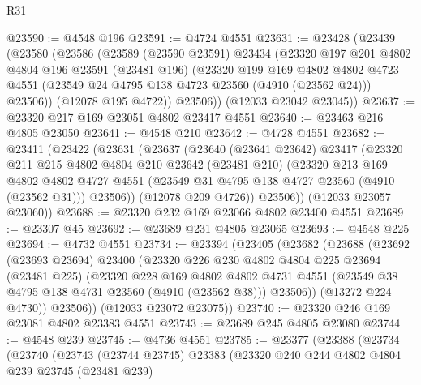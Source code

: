 \begin{lexlean}{R31}
\begin{coremodule}
@23590 := @4548 @196
@23591 := @4724 @4551
@23631 := @23428
    (@23439
      (@23580
        (@23586
          (@23589
            (@23590 @23591)
            @23434
            (@23320
              @197
              @201
              @4802
              @4804
              @196
              @23591
              (@23481 @196)
              (@23320
                @199
                @169
                @4802
                @4802
                @4723
                @4551
                (@23549 @24 @4795 @138 @4723 @23560 (@4910 (@23562 @24)))
                @23506))
            (@12078 @195 @4722))
          @23506))
      (@12033 @23042 @23045))
@23637 := @23320 @217 @169 @23051 @4802 @23417 @4551
@23640 := @23463 @216 @4805 @23050
@23641 := @4548 @210
@23642 := @4728 @4551
@23682 := @23411
    (@23422
      (@23631
        (@23637
          (@23640
            (@23641 @23642)
            @23417
            (@23320
              @211
              @215
              @4802
              @4804
              @210
              @23642
              (@23481 @210)
              (@23320
                @213
                @169
                @4802
                @4802
                @4727
                @4551
                (@23549 @31 @4795 @138 @4727 @23560 (@4910 (@23562 @31)))
                @23506))
            (@12078 @209 @4726))
          @23506))
      (@12033 @23057 @23060))
@23688 := @23320 @232 @169 @23066 @4802 @23400 @4551
@23689 := @23307 @45
@23692 := @23689 @231 @4805 @23065
@23693 := @4548 @225
@23694 := @4732 @4551
@23734 := @23394
    (@23405
      (@23682
        (@23688
          (@23692
            (@23693 @23694)
            @23400
            (@23320
              @226
              @230
              @4802
              @4804
              @225
              @23694
              (@23481 @225)
              (@23320
                @228
                @169
                @4802
                @4802
                @4731
                @4551
                (@23549 @38 @4795 @138 @4731 @23560 (@4910 (@23562 @38)))
                @23506))
            (@13272 @224 @4730))
          @23506))
      (@12033 @23072 @23075))
@23740 := @23320 @246 @169 @23081 @4802 @23383 @4551
@23743 := @23689 @245 @4805 @23080
@23744 := @4548 @239
@23745 := @4736 @4551
@23785 := @23377
    (@23388
      (@23734
        (@23740
          (@23743
            (@23744 @23745)
            @23383
            (@23320
              @240
              @244
              @4802
              @4804
              @239
              @23745
              (@23481 @239)

\end{coremodule}
\end{lexlean}
